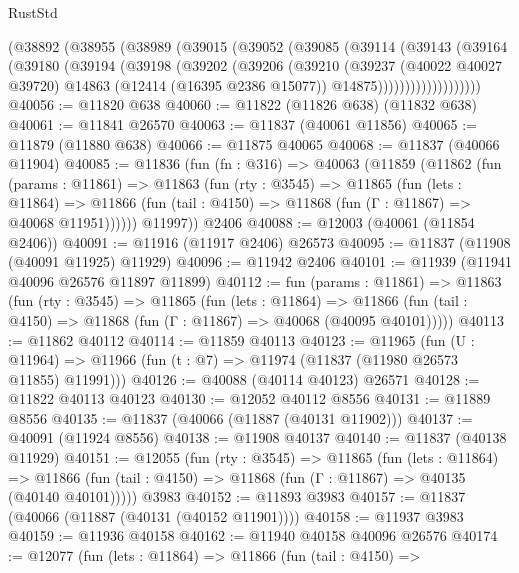 \begin{lexlean}{RustStd}
\begin{coremodule}
          (@38892
            (@38955
              (@38989
                (@39015
                  (@39052
                    (@39085
                      (@39114
                        (@39143
                          (@39164
                            (@39180
                              (@39194
                                (@39198
                                  (@39202
                                    (@39206
                                      (@39210
                                        (@39237
                                          (@40022 @40027 @39720)
                                          @14863
                                          (@12414 (@16395 @2386 @15077))
                                          @14875)))))))))))))))))))
@40056 := @11820 @638
@40060 := @11822 (@11826 @638) (@11832 @638)
@40061 := @11841 @26570
@40063 := @11837 (@40061 @11856)
@40065 := @11879 (@11880 @638)
@40066 := @11875 @40065
@40068 := @11837 (@40066 @11904)
@40085 := @11836
    (fun (fn : @316) =>
    @40063
      (@11859
        (@11862
          (fun (params : @11861) =>
          @11863
            (fun (rty : @3545) =>
            @11865
              (fun (lets : @11864) =>
              @11866 (fun (tail : @4150) => @11868 (fun (Γ : @11867) => @40068 @11951))))))
        @11997))
    @2406
@40088 := @12003 (@40061 (@11854 @2406))
@40091 := @11916 (@11917 @2406) @26573
@40095 := @11837 (@11908 (@40091 @11925) @11929)
@40096 := @11942 @2406
@40101 := @11939 (@11941 @40096 @26576 @11897 @11899)
@40112 := fun (params : @11861) =>
  @11863
    (fun (rty : @3545) =>
    @11865
      (fun (lets : @11864) =>
      @11866 (fun (tail : @4150) => @11868 (fun (Γ : @11867) => @40068 (@40095 @40101)))))
@40113 := @11862 @40112
@40114 := @11859 @40113
@40123 := @11965
    (fun (U : @11964) => @11966 (fun (t : @7) => @11974 (@11837 (@11980 @26573 @11855) @11991)))
@40126 := @40088 (@40114 @40123) @26571
@40128 := @11822 @40113 @40123
@40130 := @12052 @40112 @8556
@40131 := @11889 @8556
@40135 := @11837 (@40066 (@11887 (@40131 @11902)))
@40137 := @40091 (@11924 @8556)
@40138 := @11908 @40137
@40140 := @11837 (@40138 @11929)
@40151 := @12055
    (fun (rty : @3545) =>
    @11865
      (fun (lets : @11864) =>
      @11866 (fun (tail : @4150) => @11868 (fun (Γ : @11867) => @40135 (@40140 @40101)))))
    @3983
@40152 := @11893 @3983
@40157 := @11837 (@40066 (@11887 (@40131 (@40152 @11901))))
@40158 := @11937 @3983
@40159 := @11936 @40158
@40162 := @11940 @40158 @40096 @26576
@40174 := @12077
    (fun (lets : @11864) =>
    @11866
      (fun (tail : @4150) =>

\end{coremodule}
\end{lexlean}
